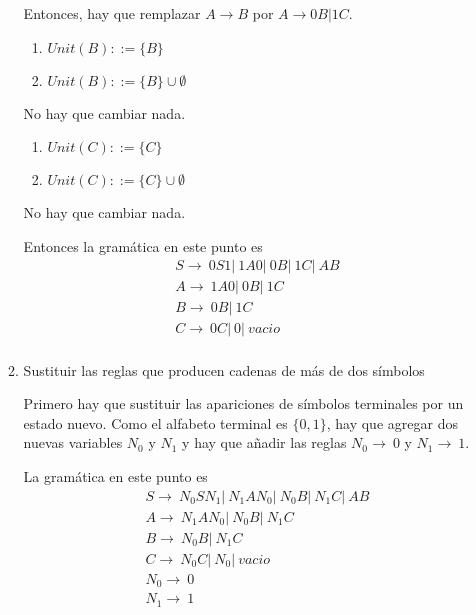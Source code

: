 \documentclass{article}
\begin{document}
\begin{enumerate}
\begin{enumerate}
        Entonces, hay que remplazar $A \rightarrow B$ por $A \rightarrow 0B| 1C$.

        \begin{enumerate}
            \item $Unit(B) ::= \{B\}$
            \item $Unit(B) ::= \{B\} \cup \emptyset$
        \end{enumerate}
        No hay que cambiar nada.

        \begin{enumerate}
            \item $Unit(C) ::= \{C\}$
            \item $Unit(C) ::= \{C\} \cup \emptyset$
        \end{enumerate}
        No hay que cambiar nada.

        Entonces la gramática en este punto es 
        \begin{align*}
            &S \rightarrow \ 0S1 |\ 1A0 |\ 0B |\ 1C |\ AB \\
            &A \rightarrow \ 1A0 | \ 0B | \ 1C\\
            &B \rightarrow \ 0B |\ 1C \\
            &C \rightarrow \ 0C |\ 0 |\ vacio \\
        \end{align*}

        \item Sustituir las reglas que producen cadenas de más de dos símbolos
        
        Primero hay que sustituir las apariciones de símbolos terminales por un
        estado nuevo. Como el alfabeto terminal es $\{0, 1\}$, hay que agregar 
        dos nuevas variables $N_0$ y $N_1$ y hay que añadir las reglas $N_0 \rightarrow \ 0 $ y $N_1 \rightarrow \ 1$.

        La gramática en este punto es
        \begin{align*}
            &S \rightarrow \ N_0SN_1 |\  N_1AN_0  |\  N_0B |\ N_1C |\ AB \\
            &A \rightarrow \ N_1AN_0 |\ N_0B |\ N_1C \\
            &B \rightarrow \ N_0B |\ N_1C \\
            &C \rightarrow \ N_0C |\ N_0 |\ vacio \\
            &N_0 \rightarrow \ 0 \\
            &N_1 \rightarrow \ 1
        \end{align*}


\end{enumerate}
\end{enumerate}
\end{document}
